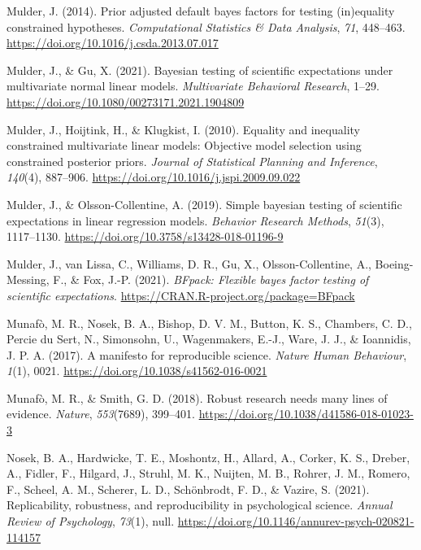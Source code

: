 \documentclass[
]{interact}
\newlength{\cslhangindent}
\newlength{\cslentryspacingunit} %
\newenvironment{CSLReferences}[2] %
 {%
  \setlength{\parindent}{0pt}
  \ifodd #1
  \let\oldpar\par
  \def\par{\hangindent=\cslhangindent\oldpar}
  \fi
  \setlength{\parskip}{#2\cslentryspacingunit}
 }%
 {}
\begin{document}
\begin{CSLReferences}{1}{0}
\leavevmode{}%
Mulder, J. (2014). Prior adjusted default bayes factors for testing
(in)equality constrained hypotheses. \emph{Computational Statistics \&
Data Analysis}, \emph{71}, 448--463.
\url{https://doi.org/10.1016/j.csda.2013.07.017}

\leavevmode{}%
Mulder, J., \& Gu, X. (2021). Bayesian testing of scientific
expectations under multivariate normal linear models. \emph{Multivariate
Behavioral Research}, 1--29.
\url{https://doi.org/10.1080/00273171.2021.1904809}

\leavevmode{}%
Mulder, J., Hoijtink, H., \& Klugkist, I. (2010). Equality and
inequality constrained multivariate linear models: Objective model
selection using constrained posterior priors. \emph{Journal of
Statistical Planning and Inference}, \emph{140}(4), 887--906.
\url{https://doi.org/10.1016/j.jspi.2009.09.022}

\leavevmode{}%
Mulder, J., \& Olsson-Collentine, A. (2019). Simple bayesian testing of
scientific expectations in linear regression models. \emph{Behavior
Research Methods}, \emph{51}(3), 1117--1130.
\url{https://doi.org/10.3758/s13428-018-01196-9}

\leavevmode{}%
Mulder, J., van Lissa, C., Williams, D. R., Gu, X., Olsson-Collentine,
A., Boeing-Messing, F., \& Fox, J.-P. (2021). \emph{BFpack: Flexible
bayes factor testing of scientific expectations}.
\url{https://CRAN.R-project.org/package=BFpack}

\leavevmode{}%
Munafò, M. R., Nosek, B. A., Bishop, D. V. M., Button, K. S., Chambers,
C. D., Percie du Sert, N., Simonsohn, U., Wagenmakers, E.-J., Ware, J.
J., \& Ioannidis, J. P. A. (2017). A manifesto for reproducible science.
\emph{Nature Human Behaviour}, \emph{1}(1), 0021.
\url{https://doi.org/10.1038/s41562-016-0021}

\leavevmode{}%
Munafò, M. R., \& Smith, G. D. (2018). Robust research needs many lines
of evidence. \emph{Nature}, \emph{553}(7689), 399--401.
\url{https://doi.org/10.1038/d41586-018-01023-3}

\leavevmode{}%
Nosek, B. A., Hardwicke, T. E., Moshontz, H., Allard, A., Corker, K. S.,
Dreber, A., Fidler, F., Hilgard, J., Struhl, M. K., Nuijten, M. B.,
Rohrer, J. M., Romero, F., Scheel, A. M., Scherer, L. D., Schönbrodt, F.
D., \& Vazire, S. (2021). Replicability, robustness, and reproducibility
in psychological science. \emph{Annual Review of Psychology},
\emph{73}(1), null.
\url{https://doi.org/10.1146/annurev-psych-020821-114157}


\end{CSLReferences}
\end{document}
